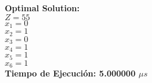 \documentclass[12pt]{article}
\newcommand\tab[1][1cm]{\hspace*{#1}}
\begin{document}
\textbf{Optimal Solution:}\\
\tab $Z = 55$\\
\tab$x_{1} = 0$\\
\tab$x_{2} = 1$\\
\tab$x_{3} = 0$\\
\tab$x_{4} = 1$\\
\tab$x_{5} = 1$\\
\tab$x_{6} = 1$\\
\textbf{Tiempo de Ejecuci\'on: 5.000000 $\mu s$} \\
\end{document}
